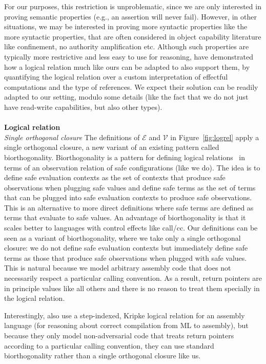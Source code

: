 \documentclass[acmsmall,review]{acmart}\settopmatter{printfolios=true}
\newcommand{\asmType}{\plaindom{AsmType}}
\newcommand{\plaindom}[1]{\mathrm{#1}}
\newcommand{\intr}[2]{\mathcal{#1}}
\newcommand{\valueintr}[1]{\intr{V}{#1}}
\newcommand{\exprintr}[1]{\intr{E}{#1}}
\newcommand{\stdvr}{\valueintr{\asmType}}
\newcommand{\stder}{\exprintr{\asmType}}
\begin{document}
For our purposes, this restriction is unproblematic, since we are only
interested in proving semantic properties (e.g., an assertion will never fail).
However, in other situations, we may be interested in proving more syntactic
properties like the more syntactic properties, that are often considered in
object capability literature like confinement, no authority amplification etc.
Although such properties are typically more restrictive and less easy to use for
reasoning, \citet{Devriese:2016ObjCap} have demonstrated how a logical relation
much like ours can be adapted to also support them, by quantifying the logical
relation over a custom interpretation of effectful computations and the type of
references. We expect their solution can be readily adapted to our setting,
modulo some details (like the fact that we do not just have read-write
capabilities, but also other types).\\\\

\noindent\textbf{Logical relation}\\
\emph{Single orthogonal closure} The definitions of $\stder$ and $\stdvr$ in
Figure~\ref{fig:logrel} apply a single orthogonal closure, a new variant of an
existing pattern called biorthogonality. Biorthogonality is a pattern for
defining logical relations~\citep{krivine_classical_1994,pitts_operational_1998}
in terms of an observation relation of safe configurations (like we do). The
idea is to define safe evaluation contexts as the set of contexts that produce
safe observations when plugging safe values and define safe terms as the set of
terms that can be plugged into safe evaluation contexts to produce safe
observations. This is an alternative to more direct definitions where safe terms
are defined as terms that evaluate to safe values. An advantage of
biorthogonality is that it scales better to languages with control effects like
call/cc. Our definitions can be seen as a variant of biorthogonality, where we
take only a single orthogonal closure: we do not define safe evaluation contexts
but immediately define safe terms as those that produce safe observations when
plugged with safe values. This is natural because we model arbitrary assembly
code that does not necessarily respect a particular calling convention. As a
result, return pointers are in principle values like all others and there is no
reason to treat them specially in the logical relation.

Interestingly, \citet{Hur:2011:KLR:1926385.1926402} also use a step-indexed,
Kripke logical relation for an assembly language (for reasoning about correct
compilation from ML to assembly), but because they only model non-adversarial
code that treats return pointers according to a particular calling convention,
they can use standard biorthogonality rather than a single orthogonal closure
like us.
\end{document}
